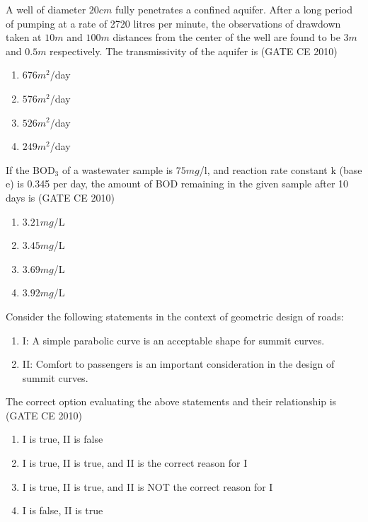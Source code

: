     \item A well of diameter $20 cm$ fully penetrates a confined aquifer. After a long period of pumping at a rate of 2720 litres per minute, the observations of drawdown taken at  
    $10m$ and $100 m$ distances from the center of the well are found to be $3 m$ and $0.5 m$ respectively. The transmissivity of the aquifer  
    is \hfill (GATE CE 2010)
    \begin{multicols}{4}
        \begin{enumerate}
            \item $676 m^2$/day
            \item $576 m^2$/day
            \item $526 m^2$/day
            \item $249 m^2$/day
        \end{enumerate}
    \end{multicols}

    \item If the BOD$_3$ of a wastewater sample is $75 mg$/l, and reaction rate constant k (base e) is 0.345 per day, the amount of BOD remaining in the given sample after 10 days is   \hfill (GATE CE 2010)

    \begin{multicols}{4}
        \begin{enumerate}
            \item $3.21 mg$/L
            \item $3.45 mg$/L
            \item $3.69 mg$/L
            \item $3.92 mg$/L
        \end{enumerate}
    \end{multicols}

    \item Consider the following statements in the context of geometric design of roads:
    \begin{enumerate}
        \item[] I: A simple parabolic curve is an acceptable shape for summit curves.
        \item[] II: Comfort to passengers is an important consideration in the design of summit curves.
    \end{enumerate}
    The correct option evaluating the above statements and their relationship is   \hfill (GATE CE 2010)

    \begin{enumerate}
        \item I is true, II is false
        \item I is true, II is true, and II is the correct reason for I
        \item I is true, II is true, and II is NOT the correct reason for I
        \item I is false, II is true
    \end{enumerate}

